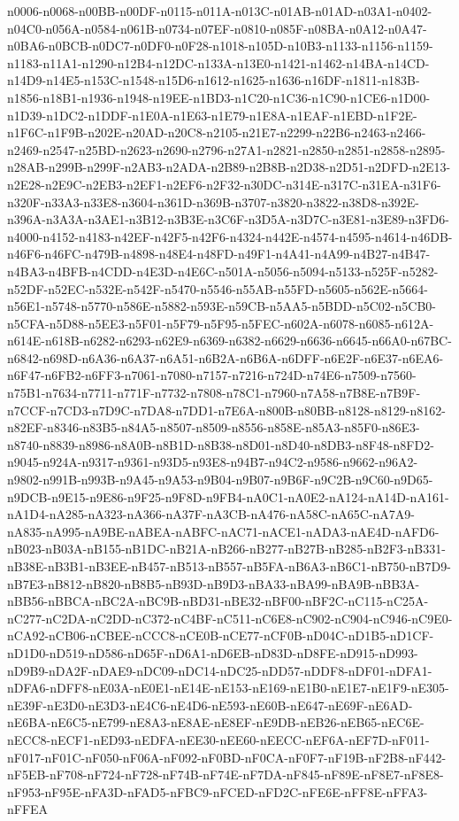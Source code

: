 \documentclass[12pt]{article}
\begin{document}
n0006-n0068-n00BB-n00DF-n0115-n011A-n013C-n01AB-n01AD-n03A1-n0402-n04C0-n056A-n0584-n061B-n0734-n07EF-n0810-n085F-n08BA-n0A12-n0A47-n0BA6-n0BCB-n0DC7-n0DF0-n0F28-n1018-n105D-n10B3-n1133-n1156-n1159-n1183-n11A1-n1290-n12B4-n12DC-n133A-n13E0-n1421-n1462-n14BA-n14CD-n14D9-n14E5-n153C-n1548-n15D6-n1612-n1625-n1636-n16DF-n1811-n183B-n1856-n18B1-n1936-n1948-n19EE-n1BD3-n1C20-n1C36-n1C90-n1CE6-n1D00-n1D39-n1DC2-n1DDF-n1E0A-n1E63-n1E79-n1E8A-n1EAF-n1EBD-n1F2E-n1F6C-n1F9B-n202E-n20AD-n20C8-n2105-n21E7-n2299-n22B6-n2463-n2466-n2469-n2547-n25BD-n2623-n2690-n2796-n27A1-n2821-n2850-n2851-n2858-n2895-n28AB-n299B-n299F-n2AB3-n2ADA-n2B89-n2B8B-n2D38-n2D51-n2DFD-n2E13-n2E28-n2E9C-n2EB3-n2EF1-n2EF6-n2F32-n30DC-n314E-n317C-n31EA-n31F6-n320F-n33A3-n33E8-n3604-n361D-n369B-n3707-n3820-n3822-n38D8-n392E-n396A-n3A3A-n3AE1-n3B12-n3B3E-n3C6F-n3D5A-n3D7C-n3E81-n3E89-n3FD6-n4000-n4152-n4183-n42EF-n42F5-n42F6-n4324-n442E-n4574-n4595-n4614-n46DB-n46F6-n46FC-n479B-n4898-n48E4-n48FD-n49F1-n4A41-n4A99-n4B27-n4B47-n4BA3-n4BFB-n4CDD-n4E3D-n4E6C-n501A-n5056-n5094-n5133-n525F-n5282-n52DF-n52EC-n532E-n542F-n5470-n5546-n55AB-n55FD-n5605-n562E-n5664-n56E1-n5748-n5770-n586E-n5882-n593E-n59CB-n5AA5-n5BDD-n5C02-n5CB0-n5CFA-n5D88-n5EE3-n5F01-n5F79-n5F95-n5FEC-n602A-n6078-n6085-n612A-n614E-n618B-n6282-n6293-n62E9-n6369-n6382-n6629-n6636-n6645-n66A0-n67BC-n6842-n698D-n6A36-n6A37-n6A51-n6B2A-n6B6A-n6DFF-n6E2F-n6E37-n6EA6-n6F47-n6FB2-n6FF3-n7061-n7080-n7157-n7216-n724D-n74E6-n7509-n7560-n75B1-n7634-n7711-n771F-n7732-n7808-n78C1-n7960-n7A58-n7B8E-n7B9F-n7CCF-n7CD3-n7D9C-n7DA8-n7DD1-n7E6A-n800B-n80BB-n8128-n8129-n8162-n82EF-n8346-n83B5-n84A5-n8507-n8509-n8556-n858E-n85A3-n85F0-n86E3-n8740-n8839-n8986-n8A0B-n8B1D-n8B38-n8D01-n8D40-n8DB3-n8F48-n8FD2-n9045-n924A-n9317-n9361-n93D5-n93E8-n94B7-n94C2-n9586-n9662-n96A2-n9802-n991B-n993B-n9A45-n9A53-n9B04-n9B07-n9B6F-n9C2B-n9C60-n9D65-n9DCB-n9E15-n9E86-n9F25-n9F8D-n9FB4-nA0C1-nA0E2-nA124-nA14D-nA161-nA1D4-nA285-nA323-nA366-nA37F-nA3CB-nA476-nA58C-nA65C-nA7A9-nA835-nA995-nA9BE-nABEA-nABFC-nAC71-nACE1-nADA3-nAE4D-nAFD6-nB023-nB03A-nB155-nB1DC-nB21A-nB266-nB277-nB27B-nB285-nB2F3-nB331-nB38E-nB3B1-nB3EE-nB457-nB513-nB557-nB5FA-nB6A3-nB6C1-nB750-nB7D9-nB7E3-nB812-nB820-nB8B5-nB93D-nB9D3-nBA33-nBA99-nBA9B-nBB3A-nBB56-nBBCA-nBC2A-nBC9B-nBD31-nBE32-nBF00-nBF2C-nC115-nC25A-nC277-nC2DA-nC2DD-nC372-nC4BF-nC511-nC6E8-nC902-nC904-nC946-nC9E0-nCA92-nCB06-nCBEE-nCCC8-nCE0B-nCE77-nCF0B-nD04C-nD1B5-nD1CF-nD1D0-nD519-nD586-nD65F-nD6A1-nD6EB-nD83D-nD8FE-nD915-nD993-nD9B9-nDA2F-nDAE9-nDC09-nDC14-nDC25-nDD57-nDDF8-nDF01-nDFA1-nDFA6-nDFF8-nE03A-nE0E1-nE14E-nE153-nE169-nE1B0-nE1E7-nE1F9-nE305-nE39F-nE3D0-nE3D3-nE4C6-nE4D6-nE593-nE60B-nE647-nE69F-nE6AD-nE6BA-nE6C5-nE799-nE8A3-nE8AE-nE8EF-nE9DB-nEB26-nEB65-nEC6E-nECC8-nECF1-nED93-nEDFA-nEE30-nEE60-nEECC-nEF6A-nEF7D-nF011-nF017-nF01C-nF050-nF06A-nF092-nF0BD-nF0CA-nF0F7-nF19B-nF2B8-nF442-nF5EB-nF708-nF724-nF728-nF74B-nF74E-nF7DA-nF845-nF89E-nF8E7-nF8E8-nF953-nF95E-nFA3D-nFAD5-nFBC9-nFCED-nFD2C-nFE6E-nFF8E-nFFA3-nFFEA
\end{document}
